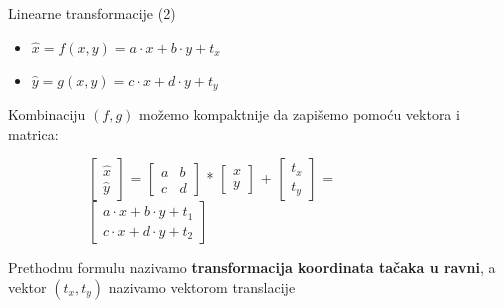 \documentclass[bookmarks=true,bookmarksopen=true,pdfborder={0 0 0},pdfhighlight={/N},linkbordercolor={.5 .5 .5},implicit=false,unicode,xcolor={table}]{beamer}
\begin{document}
\begin{frame}{Linearne transformacije (2)}

  \begin{itemize}
    \item $\hat{x} = f(x, y) = a\cdot x + b\cdot y + t_{x}$
    \item $\hat{y} = g(x, y) = c\cdot x + d\cdot y + t_{y}$
  \end{itemize}
  Kombinaciju $(f, g)$ možemo kompaktnije da zapišemo pomoću vektora i matrica:
  \begin{figure}
    \begin{subfigure}{9cm}
      $\begin{bmatrix}
        \hat{x}\\
        \hat{y}
        \end{bmatrix}$
      =
      $\begin{bmatrix}
        a & b\\
        c & d
        \end{bmatrix}$
      *
      $\begin{bmatrix}
        x\\
        y
        \end{bmatrix}$
      + 
      $\begin{bmatrix}
        t_{x}\\
        t_{y}
        \end{bmatrix}$
      = 
      $\begin{bmatrix}
        a\cdot x + b\cdot y + t_{1}\\
        c\cdot x + d\cdot y + t_{2}
        \end{bmatrix}$
    \end{subfigure}
  \end{figure}
  Prethodnu formulu nazivamo \textbf{transformacija koordinata tačaka u ravni}, a vektor $(t_{x}, t_{y})$ nazivamo vektorom translacije

\end{frame}
\end{document}
